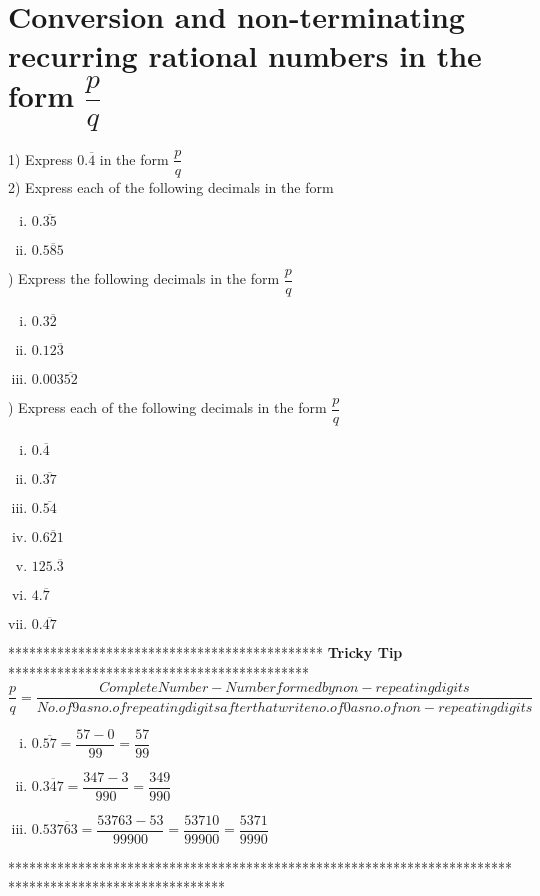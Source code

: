 \documentclass[a4paper,10pt]{article}
\begin{document}
\section{Conversion and non-terminating recurring rational numbers in
the form $\dfrac{p}{q}$}
1) Express $0.\overline{4}$ in the form $\dfrac{p}{q}$\\
2) Express each of the following decimals in the form 
\begin{multicols}{2}
\begin{enumerate}[(i)]
\item $0.\overline{35}$
\item $0.\overline{585}$
\end{enumerate}
\end{multicols}
) Express the following decimals in the form $\dfrac{p}{q}$
\begin{multicols}{3}
\begin{enumerate}[(i)]
\item $0.3\overline{2}$
\item $0.12\overline{3}$
\item $0.003\overline{52}$
\end{enumerate}
\end{multicols}
) Express each of the following decimals in the form $\dfrac{p}{q}$
\begin{multicols}{7}
\begin{enumerate}[(i)]
\item $0.\overline{4}$
\item $0.\overline{37}$
\item $0.\overline{54}$
\item $0.\overline{621}$
\item $125.\overline{3}$
\item $4.\overline{7}$
\item $0.\overline{47}$
\end{enumerate}
\end{multicols}
\vspace{5mm}
\begin{center}
********************************************* \textbf{\Large Tricky Tip}
*******************************************
$\dfrac{p}{q} = \dfrac{Complete Number - Number formed by non -
repeating digits}{No.of 9 as no.of repeating digits after that write
no.of 0 as no.of non - repeating digits}$
\begin{enumerate}[(i)]
\item  $0.\overline{57} = \dfrac{57-0}{99} = \dfrac{57}{99}$
\item $0.\overline{347} = \dfrac{347-3}{990} = \dfrac{349}{990}$
\item $0.53\overline{763} = \dfrac{53763-53}{99900} =
\dfrac{53710}{99900} = \dfrac{5371}{9990}$
\end{enumerate}
*******************************************************************************************************
\end{center}
\end{document}
